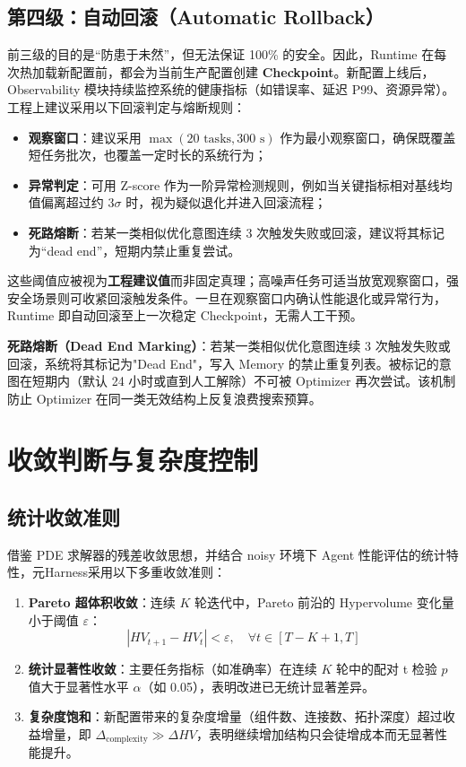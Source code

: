 \subsection{第四级：自动回滚（Automatic Rollback）}

前三级的目的是“防患于未然”，但无法保证 100\% 的安全。因此，Runtime 在每次热加载新配置前，都会为当前生产配置创建 \textbf{Checkpoint}。新配置上线后，Observability 模块持续监控系统的健康指标（如错误率、延迟 P99、资源异常）。工程上建议采用以下回滚判定与熔断规则：

\begin{itemize}
    \item \textbf{观察窗口}：建议采用 $\max(20\text{ tasks}, 300\text{ s})$ 作为最小观察窗口，确保既覆盖短任务批次，也覆盖一定时长的系统行为；
    \item \textbf{异常判定}：可用 Z-score 作为一阶异常检测规则，例如当关键指标相对基线均值偏离超过约 $3\sigma$ 时，视为疑似退化并进入回滚流程；
    \item \textbf{死路熔断}：若某一类相似优化意图连续 3 次触发失败或回滚，建议将其标记为“dead end”，短期内禁止重复尝试。
\end{itemize}

这些阈值应被视为\textbf{工程建议值}而非固定真理；高噪声任务可适当放宽观察窗口，强安全场景则可收紧回滚触发条件。一旦在观察窗口内确认性能退化或异常行为，Runtime 即自动回滚至上一次稳定 Checkpoint，无需人工干预。

\textbf{死路熔断（Dead End Marking）}：若某一类相似优化意图连续 3 次触发失败或回滚，系统将其标记为"Dead End"，写入 Memory 的禁止重复列表。被标记的意图在短期内（默认 24 小时或直到人工解除）不可被 Optimizer 再次尝试。该机制防止 Optimizer 在同一类无效结构上反复浪费搜索预算。

\section{收敛判断与复杂度控制}

\subsection{统计收敛准则}

借鉴 PDE 求解器的残差收敛思想，并结合 noisy 环境下 Agent 性能评估的统计特性，元Harness采用以下多重收敛准则：

\begin{enumerate}
    \item \textbf{Pareto 超体积收敛}：连续 $K$ 轮迭代中，Pareto 前沿的 Hypervolume 变化量小于阈值 $\varepsilon$：
    \begin{equation}
    |HV_{t+1} - HV_t| < \varepsilon, \quad \forall t \in [T-K+1, T]
    \end{equation}
    \item \textbf{统计显著性收敛}：主要任务指标（如准确率）在连续 $K$ 轮中的配对 t 检验 $p$ 值大于显著性水平 $\alpha$（如 0.05），表明改进已无统计显著差异。
    \item \textbf{复杂度饱和}：新配置带来的复杂度增量（组件数、连接数、拓扑深度）超过收益增量，即 $\Delta_{\text{complexity}} \gg \Delta HV$，表明继续增加结构只会徒增成本而无显著性能提升。
\end{enumerate}

